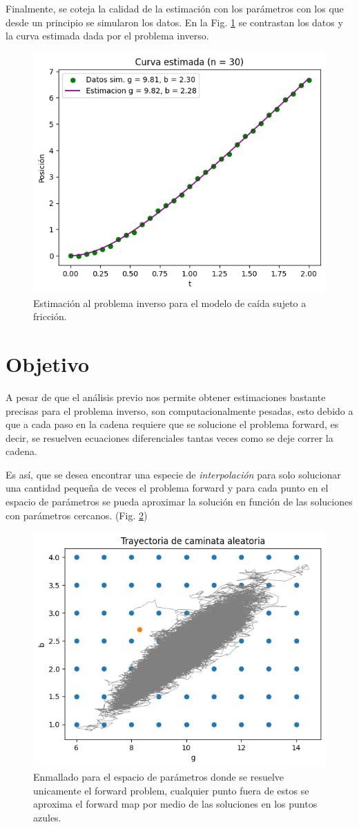 \documentclass{article}
\begin{document}
Finalmente, se coteja la calidad de la estimación con los parámetros con los que desde un principio se simularon los datos. En la Fig. \ref{Fig. 3.05} se contrastan los datos y la curva estimada dada por el problema inverso.

\begin{figure}[H]
    \centering 
    \includegraphics[width = 8 cm]{Figures/estimacion.png} 
    \caption{Estimación al problema inverso para el modelo de caída sujeto a fricción.}
    \label{Fig. 3.05}
\end{figure} 


\section{Objetivo}

A pesar de que el análisis previo nos permite obtener estimaciones bastante precisas para el problema inverso, son computacionalmente pesadas, esto debido a que a cada paso en la cadena requiere que se solucione el problema forward, es decir, se resuelven ecuaciones diferenciales tantas veces como se deje correr la cadena. 

Es así, que se desea encontrar una especie de \textit{interpolación} para solo solucionar una cantidad pequeña de veces el problema forward y para cada punto en el espacio de parámetros se pueda aproximar la solución en función de las soluciones con parámetros cercanos. (Fig. \ref{Fig. 3.06})

\begin{figure}[H]
    \centering 
    \includegraphics[width = 8 cm]{Figures/interpolacion.png} 
    \caption{Enmallado para el espacio de parámetros donde se resuelve unicamente el forward problem, cualquier punto fuera de estos se aproxima el forward map por medio de las soluciones en los puntos azules.}
    \label{Fig. 3.06}
\end{figure} 
\end{document}
